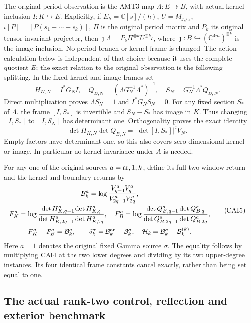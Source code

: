 The original period observation is the AMT3 map
$\Lambda:E\twoheadrightarrow B$, with actual kernel inclusion
$I:K\hookrightarrow E$. Explicitly, if $E_h=\mathbb C[s]/(h)$,
$U=M_{j_hv_h}$, $\iota[P]=[P(s_1+\cdots+s_k)]$, $\Pi$ is the original
period matrix and $P_k$ its original tensor invariant projector, then
$\jmath\Lambda=P_k\Pi^{\otimes k}U^{\otimes k}\iota$, where
$\jmath:B\hookrightarrow(\mathbb C^{4m})^{\otimes k}$ is the image
inclusion. No period branch or kernel frame is changed. The action
calculation below is independent of that choice because it uses the
complete quotient $E$; the exact relation to the original observation
is the following splitting. In the fixed kernel and image frames set
\[
 H_{K,N}=I^*G_NI,\quad
 Q_{B,N}=(\Lambda G_N^{-1}\Lambda^*)^{-1},\quad
 S_N=G_N^{-1}\Lambda^*Q_{B,N}.\tag{CAI3}
\]
Direct multiplication proves $\Lambda S_N=1$ and $I^*G_NS_N=0$.
For any fixed section $S_*$ of $\Lambda$, the frame $[I,S_*]$ is
invertible and $S_N-S_*$ has image in $K$. Thus changing $[I,S_*]$ to
$[I,S_N]$ has determinant one. Orthogonality proves the exact identity
\[
 \det H_{K,N}\det Q_{B,N}=|\det[I,S_*]|^2V_N.\tag{CAI4}
\]
Empty factors have determinant one, so this also covers zero-dimensional
kernel or image. In particular no kernel invariance under $A$ is needed.

For any one of the original sources $a={\rm ar},1,k$, define its full
two-window return and the kernel and boundary returns by
\[
\begin{gathered}
 \mathcal B_k^a=\log\frac{V_{q-1}^aV_q^a}{V_{2q-1}^aV_{2q}^a},\\
 F_K^a=\log\frac{\det H_{K,q-1}^a\det H_{K,q}^a}
                       {\det H_{K,2q-1}^a\det H_{K,2q}^a},\quad
 F_B^a=\log\frac{\det Q_{B,q-1}^a\det Q_{B,q}^a}
                       {\det Q_{B,2q-1}^a\det Q_{B,2q}^a},\\
 F_K^a+F_B^a=\mathcal B_k^a,\qquad
 \delta_k^\sigma=\mathcal B_k^{\rm ar}-\mathcal B_k^\sigma,\quad
 \mathcal H_k=\mathcal B_k^\sigma-\mathcal B_k^{(k)}.
\end{gathered}\tag{CAI5}
\]
Here $a=1$ denotes the original fixed Gamma source $\sigma$.
The equality follows by multiplying CAI4 at the two lower degrees and
dividing by its two upper-degree instances. Its four identical frame
constants cancel exactly, rather than being set equal to one.

\subsection{The actual rank-two control, reflection and exterior benchmark}

